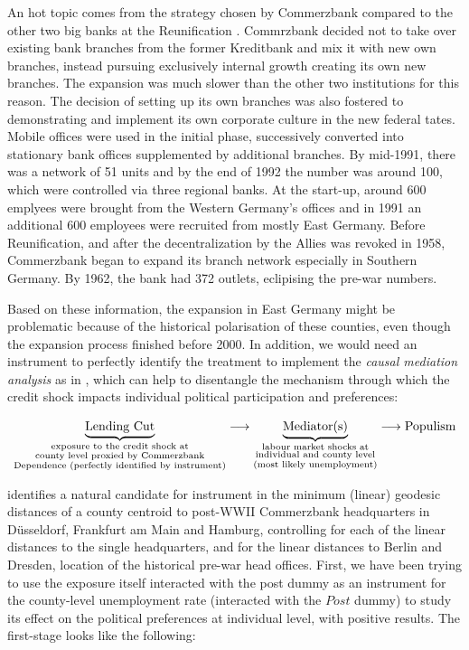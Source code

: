 \documentclass[11pt]{article}
\begin{document}
An hot topic comes from the strategy chosen by Commerzbank compared to the other two big banks at the Reunification \citep[see][]{bib:klein1993}. Commrzbank decided not to take over existing bank branches from the former Kreditbank and mix it with new own branches, instead pursuing exclusively internal growth creating its own new branches. The expansion was much slower than the other two institutions for this reason. The decision of setting up its own branches was also fostered to demonstrating and implement its own corporate culture in the new federal tates. Mobile offices were used in the initial phase, successively converted into stationary bank offices supplemented by additional branches. By mid-1991, there was a network of 51 units and by the end of 1992 the number was around 100, which were controlled via three regional banks. At the start-up, around 600 emplyees were brought from the Western Germany's offices and in 1991 an additional 600 employees were recruited from mostly East Germany. Before Reunification, and after the decentralization by the Allies was revoked in 1958, Commerzbank began to expand its branch network especially in Southern Germany. By 1962, the bank had 372 outlets, eclipising the pre-war numbers.

Based on these information, the expansion in East Germany might be problematic because of the historical polarisation of these counties, even though the expansion process finished before 2000. In addition, we would need an instrument to perfectly identify the treatment to implement the \textit{causal mediation analysis} as in \citet{bib:dippel2021a}, which can help to disentangle the mechanism through which the credit shock impacts individual political participation and preferences:

\begin{equation*}
    \underbrace{\text{Lending Cut}}_{\substack{\text{exposure to the credit shock at}\\ \text{county level proxied by Commerzbank}\\ \text{Dependence (perfectly identified by instrument)}}} \longrightarrow \underbrace{\text{Mediator(s)}}_{\substack{\text{labour market shocks at}\\ \text{individual and county level}\\ \text{(most likely unemployment)}}} \longrightarrow \text{Populism}
\end{equation*}

\citet{bib:huber2018} identifies a natural candidate for instrument in the minimum (linear) geodesic distances of a county centroid to post-WWII Commerzbank headquarters in D\"{u}sseldorf, Frankfurt am Main and Hamburg, controlling for each of the linear distances to the single headquarters, and for the linear distances to Berlin and Dresden, location of the historical pre-war head offices.
First, we have been trying to use the exposure itself interacted with the post dummy as an instrument for the county-level unemployment rate (interacted with the $Post$ dummy) to study its effect on the political preferences at individual level, with positive results. The first-stage looks like the following:
\end{document}

